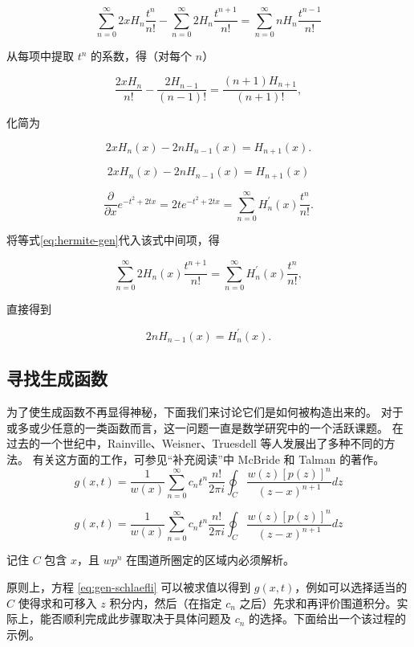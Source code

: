 $$
\sum_{n=0}^{\infty} 2 x H_n \frac{t^n}{n!}-\sum_{n=0}^{\infty} 2 H_n
\frac{t^{n+1}}{n!}=\sum_{n=0}^{\infty} n H_n \frac{t^{n-1}}{n!}
$$

从每项中提取 $t^n$ 的系数，得（对每个 $n$）

$$
\frac{2 x H_n}{n!}-\frac{2 H_{n-1}}{(n-1)!}=\frac{(n+1) H_{n+1}}{(n+1)!},
$$

化简为

$$
2 x H_n(x)-2 n H_{n-1}(x)=H_{n+1}(x) .
$$

\begin{equation}
2 x H_n(x)-2 n H_{n-1}(x)=H_{n+1}(x) 
\label{eq:hermite-recur}
\end{equation}

$$
\frac{\partial}{\partial x} e^{-t^2+2 t x}=2 t e^{-t^2+2 t x}=
\sum_{n=0}^{\infty} H_n^{\prime}(x) \frac{t^n}{n!} .
$$

将等式\eqref{eq:hermite-gen}代入该式中间项，得

$$
\sum_{n=0}^{\infty} 2 H_n(x) \frac{t^{n+1}}{n!}=
\sum_{n=0}^{\infty} H_n^{\prime}(x) \frac{t^n}{n!},
$$

直接得到

$$
2 n H_{n-1}(x)=H_n^{\prime}(x) .
$$


\subsection{寻找生成函数}

为了使生成函数不再显得神秘，下面我们来讨论它们是如何被构造出来的。
对于或多或少任意的一类函数而言，这一问题一直是数学研究中的一个活跃课题。
在过去的一个世纪中，Rainville、Weisner、Truesdell 等人发展出了多种不同的方法。
有关这方面的工作，可参见“补充阅读”中 McBride 和 Talman 的著作。
\begin{equation}
g(x, t)=\frac{1}{w(x)} \sum_{n=0}^{\infty} c_n t^n \frac{n!}{2 \pi i} \oint_C \frac{w(z)[p(z)]^n}{(z-x)^{n+1}} d z
\label{eq:gen-schlaefli}
\end{equation}

$$
g(x, t)=\frac{1}{w(x)} \sum_{n=0}^{\infty} c_n t^n \frac{n!}{2 \pi i} \oint_C \frac{w(z)[p(z)]^n}{(z-x)^{n+1}} d z
$$

记住 $C$ 包含 $x$，且 $w p^n$ 在围道所圈定的区域内必须解析。

原则上，方程 \eqref{eq:gen-schlaefli} 可以被求值以得到 $g(x,t)$，例如可以选择适当的 $C$ 使得求和可移入 $z$ 积分内，然后（在指定 $c_n$ 之后）先求和再评价围道积分。实际上，能否顺利完成此步骤取决于具体问题及 $c_n$ 的选择。下面给出一个该过程的示例。

